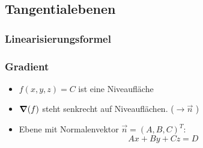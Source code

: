 \subsection{Tangentialebenen}
    \subsubsection{Linearisierungsformel}
    \subsubsection{Gradient}
        \begin{itemize}
            \item $f(x,y,z) = C$ ist eine Niveaufläche
            \item $\grad(f)$ steht senkrecht auf Niveauflächen. ($\to \vec{n}$ )
            \item Ebene mit Normalenvektor $\vec{n}= (A,B,C)^T$:
            $$
                Ax + By + Cz = D
            $$
        \end{itemize}
